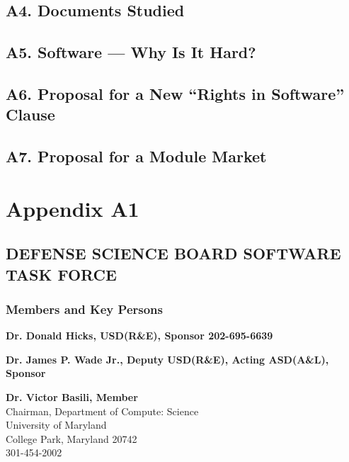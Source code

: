 \documentclass[12pt,final]{article}
\begin{document}
\subsection*{A4. Documents Studied}

\subsection*{A5. Software — Why Is It Hard?}

\subsection*{A6. Proposal for a New “Rights in Software” Clause}

\subsection*{A7. Proposal for a Module Market}

\newpage

\section*{Appendix A1}
\begin{centering}

\subsection*{DEFENSE SCIENCE BOARD SOFTWARE TASK FORCE}

\subsubsection*{Members and Key Persons}
\end{centering}

\textbf{Dr. Donald Hicks, USD(R\&E), Sponsor 202-695-6639}

\medskip

\textbf{Dr. James P. Wade Jr., Deputy USD(R\&E), Acting ASD(A\&L), Sponsor}

\medskip

\textbf{Dr. Victor Basili, Member}\\
\hspace*{2cm}Chairman, Department of Compute: Science\\
\hspace*{2cm}University of Maryland\\
\hspace*{2cm}College Park, Maryland 20742\\
\hspace*{2cm}301-454-2002
\end{document}
